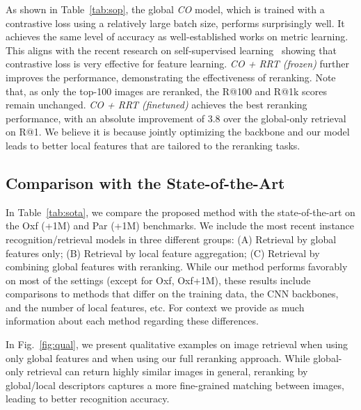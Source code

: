 As shown in Table~\ref{tab:sop}, the global \textit{CO} model, which is trained with a contrastive loss using a relatively large batch size, performs surprisingly well. 
It achieves the same level of accuracy as well-established works on metric learning.
This aligns with the recent research on self-supervised learning~\cite{simclr2020, moco2020} showing that contrastive loss is very effective for feature learning.
\textit{CO + RRT (frozen)} further improves the performance, demonstrating the effectiveness of reranking. 
Note that, as only the top-100 images are reranked, the R@100 and R@1k scores remain unchanged.
\textit{CO + RRT (finetuned)} achieves the best reranking performance, with an absolute improvement of 3.8 over the global-only retrieval on R@1. 
We believe it is because jointly optimizing the backbone and our model leads to better local features that are tailored to the reranking tasks.



\subsection{Comparison with the State-of-the-Art}

In Table~\ref{tab:sota}, we compare the proposed method with the state-of-the-art on the Oxf (+1M) and Par (+1M) benchmarks. 
We include the most recent instance recognition/retrieval models in three different groups: (A) Retrieval by global features only; (B) Retrieval by local feature aggregation; (C) Retrieval by combining global features with reranking.
While our method performs favorably on most of the settings (except for Oxf, Oxf+1M), these results include comparisons to methods that differ on the training data, the CNN backbones, and the number of local features, etc. For context we provide as much information about each method regarding these differences.


In Fig.~\ref{fig:qual}, we present qualitative examples on image retrieval when using only global features and when using our full reranking approach. While global-only retrieval can return highly similar images in general, reranking by global/local descriptors captures a more fine-grained matching between images, leading to better recognition accuracy.

